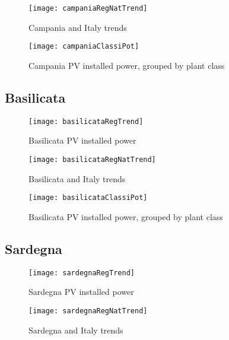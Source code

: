 \documentclass[12pt,a4paper,openright,twoside]{report}
\begin{document}
\begin{figure}[hp]
	\centering
	\texttt{[image: campaniaRegNatTrend]}
	\caption{Campania and Italy trends}
	\label{campaniaRegNatTrend}
\end{figure}

\clearpage

\begin{figure}[hp]
	\centering
	\texttt{[image: campaniaClassiPot]}
	\caption{Campania PV installed power, grouped by plant class}
	\label{campaniaClassiPot}
\end{figure}



\subsection*{Basilicata}

\begin{figure}[hp]
	\centering
	\texttt{[image: basilicataRegTrend]}
	\caption{Basilicata PV installed power}
	\label{basilicataRegTrend}
\end{figure}

\begin{figure}[hp]
	\centering
	\texttt{[image: basilicataRegNatTrend]}
	\caption{Basilicata and Italy trends}
	\label{basilicataRegNatTrend}
\end{figure}

\begin{figure}[hp]
	\centering
	\texttt{[image: basilicataClassiPot]}
	\caption{Basilicata PV installed power, grouped by plant class}
	\label{basilicataClassiPot}
\end{figure}

\clearpage

\subsection*{Sardegna}

\begin{figure}[hp]
	\centering
	\texttt{[image: sardegnaRegTrend]}
	\caption{Sardegna PV installed power}
	\label{sardegnaRegTrend}
\end{figure}

\begin{figure}[hp]
	\centering
	\texttt{[image: sardegnaRegNatTrend]}
	\caption{Sardegna and Italy trends}
	\label{sardegnaRegNatTrend}
\end{figure}
\end{document}
